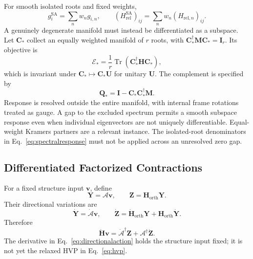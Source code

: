 \documentclass[12pt]{article}
\DeclareMathOperator{\Tr}{Tr}
\newcommand{\orth}{\mathrm{orth}}
\begin{document}
For smooth isolated roots and fixed weights,
\begin{equation}
 g_i^{\mathrm{SA}}=\sum_nw_ng_{i,n},\qquad
 (H_{\mathrm{rel}}^{\mathrm{SA}})_{ij}
 =\sum_nw_n(H_{\mathrm{rel},n})_{ij}.
 \label{eq:saderivatives}
\end{equation}
A genuinely degenerate manifold must instead be differentiated as a subspace. Let \(\mathbf C_*\) collect an equally weighted manifold of \(r\) roots, with
\(\mathbf C_*^\dagger\mathbf M\mathbf C_*=\mathbf I_r\). Its objective is
\begin{equation}
 \mathcal E_*=
 \frac1r\Tr(\mathbf C_*^\dagger\mathbf H\mathbf C_*),
 \label{eq:clusterobjective}
\end{equation}
which is invariant under \(\mathbf C_*\mapsto\mathbf C_*\mathbf U\) for unitary \(\mathbf U\). The complement is specified by
\begin{equation}
 \mathbf Q_* =\mathbf I-\mathbf C_*\mathbf C_*^\dagger\mathbf M.
 \label{eq:clustercomplement}
\end{equation}
Response is resolved outside the entire manifold, with internal frame rotations treated as gauge. A gap to the excluded spectrum permits a smooth subspace response even when individual eigenvectors are not uniquely differentiable. Equal-weight Kramers partners are a relevant instance. The isolated-root denominators in Eq.~\eqref{eq:spectralresponse} must not be applied across an unresolved zero gap.

\subsection{Differentiated Factorized Contractions}

For a fixed structure input \(\mathbf v\), define
\begin{equation}
 \mathbf Y=\boldsymbol{\mathcal A}\mathbf v,
 \qquad \mathbf Z=\mathbf H_{\orth}\mathbf Y.
\end{equation}
Their directional variations are
\begin{equation}
 \dot{\mathbf Y}=\dot{\boldsymbol{\mathcal A}}\mathbf v,
 \qquad
 \dot{\mathbf Z}=\dot{\mathbf H}_{\orth}\mathbf Y
                +\mathbf H_{\orth}\dot{\mathbf Y}.
\end{equation}
Therefore
\begin{equation}
 \dot{\mathbf H}\mathbf v=
 \dot{\boldsymbol{\mathcal A}}^\dagger\mathbf Z
 +\boldsymbol{\mathcal A}^\dagger\dot{\mathbf Z}.
 \label{eq:directionalaction}
\end{equation}
The derivative in Eq.~\eqref{eq:directionalaction} holds the structure input fixed; it is not yet the relaxed HVP in Eq.~\eqref{eq:hvp}.
\end{document}

